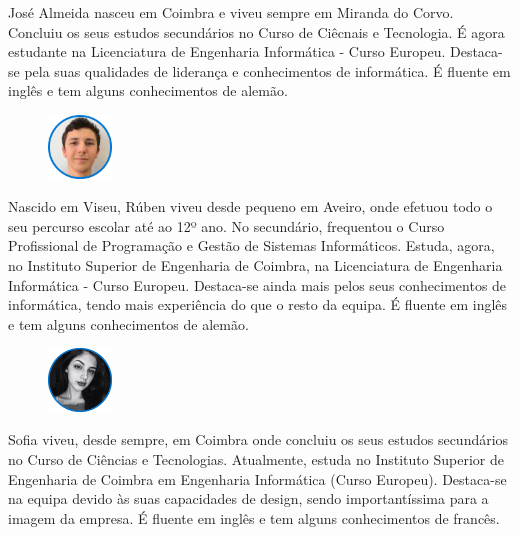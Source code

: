 \documentclass[11pt]{article}
\begin{document}
	\vspace{0.3cm}
	
	José Almeida nasceu em Coimbra e viveu sempre em Miranda do Corvo. Concluiu os seus estudos secundários no Curso de Ciêcnais e Tecnologia. É agora estudante na Licenciatura de Engenharia Informática - Curso Europeu. Destaca-se pela suas qualidades de liderança e conhecimentos de informática. É fluente em inglês e tem alguns conhecimentos de alemão.
	
	\vspace{1cm}
	
	\begin{figure}[h]
		\includegraphics[width=0.15\textwidth,keepaspectratio]{rlousada}
		\label{fig:rl}
		\centering
	\end{figure}
	
	\vspace{0.3cm}
	
	Nascido em Viseu, Rúben viveu desde pequeno em Aveiro, onde efetuou todo o seu percurso escolar até ao 12º ano. No secundário, frequentou o Curso Profissional de Programação e Gestão de Sistemas Informáticos. Estuda, agora, no Instituto Superior de Engenharia de Coimbra, na Licenciatura de Engenharia Informática - Curso Europeu. Destaca-se ainda mais pelos seus conhecimentos de informática, tendo mais experiência do que o resto da equipa. É fluente em inglês e tem alguns conhecimentos de alemão.
	
	\vspace{1cm}
	
	\begin{figure}[h]
		\includegraphics[width=0.15\textwidth,keepaspectratio]{sjaneiro}
		\label{fig:sj}
		\centering
	\end{figure}
	
	\pagebreak
	
	Sofia viveu, desde sempre, em Coimbra onde concluiu os seus estudos secundários no Curso de Ciências e Tecnologias. Atualmente, estuda no Instituto Superior de Engenharia de Coimbra em Engenharia Informática (Curso Europeu). Destaca-se na equipa devido às suas capacidades de design, sendo importantíssima para a imagem da empresa. É fluente em inglês e tem alguns conhecimentos de francês.
	
\end{document}
